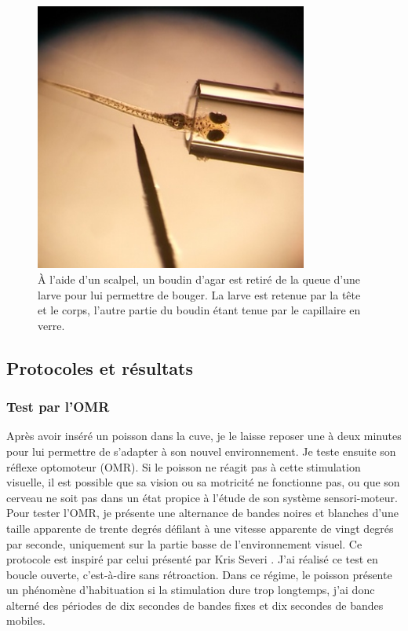 \begin{figure}
\centering
\includegraphics[width=0.8\textwidth]{./files/prepa_larve.png}
\caption{À l'aide d'un scalpel, un boudin d'agar est retiré de la queue d'une larve pour lui permettre de bouger. La larve est retenue par la tête et le corps, l'autre partie du boudin étant tenue par le capillaire en verre. }
\end{figure}

\subsection{Protocoles et résultats}

\subsubsection{Test par l'OMR}
Après avoir inséré un poisson dans la cuve, je le laisse reposer une à deux minutes pour lui permettre de s'adapter à son nouvel environnement. Je teste ensuite son réflexe optomoteur (OMR). Si le poisson ne réagit pas à cette stimulation visuelle, il est possible que sa vision ou sa motricité ne fonctionne pas, ou que son cerveau ne soit pas dans un état propice à l'étude de son système sensori-moteur. Pour tester l'OMR, je présente une alternance de bandes noires et blanches d'une taille apparente de trente degrés défilant à une vitesse apparente de vingt degrés par seconde, uniquement sur la partie basse de l'environnement visuel. Ce protocole est inspiré par celui présenté par Kris Severi \cite{severi_neural_2014}. J'ai réalisé ce test en boucle ouverte, c'est-à-dire sans rétroaction. Dans ce régime, le poisson présente un phénomène d'habituation si la stimulation dure trop longtemps, j'ai donc alterné des périodes de dix secondes de bandes fixes et dix secondes de bandes mobiles.

